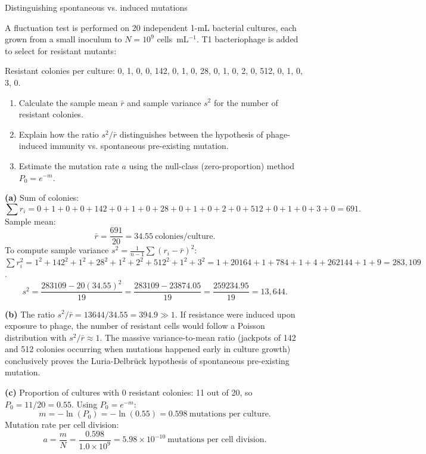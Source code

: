 \documentclass[12pt, a4paper, oneside]{report}
\begin{document}
\begin{problem}{\enspace{}\enspace
  Distinguishing spontaneous vs. induced mutations}

  A fluctuation test is performed on 20 independent 1-mL bacterial cultures, each grown from a small inoculum to $N = 10^9$ cells~mL$^{-1}$. T1 bacteriophage is added to select for resistant mutants:

  \begin{center}
  Resistant colonies per culture: 0, 1, 0, 0, 142, 0, 1, 0, 28, 0, 1, 0, 2, 0, 512, 0, 1, 0, 3, 0.
  \end{center}

  \begin{enumerate}
    \item Calculate the sample mean $\bar{r}$ and sample variance $s^2$ for the number of resistant colonies.
    \item Explain how the ratio $s^2 / \bar{r}$ distinguishes between the hypothesis of phage-induced immunity vs. spontaneous pre-existing mutation.
    \item Estimate the mutation rate $a$ using the null-class (zero-proportion) method $P_0 = e^{-m}$.
  \end{enumerate}
\end{problem}

\begin{solution}
  \textbf{(a)} Sum of colonies:
  \[
    \sum r_i = 0+1+0+0+142+0+1+0+28+0+1+0+2+0+512+0+1+0+3+0 = 691.
  \]
  Sample mean:
  \[
    \bar{r} = \frac{691}{20} = 34.55~\text{colonies/culture}.
  \]
  To compute sample variance $s^2 = \frac{1}{n-1} \sum (r_i - \bar{r})^2$:
  $\sum r_i^2 = 1^2 + 142^2 + 1^2 + 28^2 + 1^2 + 2^2 + 512^2 + 1^2 + 3^2 = 1 + 20164 + 1 + 784 + 1 + 4 + 262144 + 1 + 9 = 283{,}109$.
  \[
    s^2 = \frac{283109 - 20(34.55)^2}{19} = \frac{283109 - 23874.05}{19} = \frac{259234.95}{19} = 13{,}644.
  \]

  \textbf{(b)} The ratio $s^2 / \bar{r} = 13644 / 34.55 = 394.9 \gg 1$.
  If resistance were induced upon exposure to phage, the number of resistant cells would follow a Poisson distribution with $s^2 / \bar{r} \approx 1$. The massive variance-to-mean ratio (jackpots of 142 and 512 colonies occurring when mutations happened early in culture growth) conclusively proves the Luria-Delbrück hypothesis of spontaneous pre-existing mutation.

  \textbf{(c)} Proportion of cultures with 0 resistant colonies: 11 out of 20, so $P_0 = 11/20 = 0.55$.
  Using $P_0 = e^{-m}$:
  \[
    m = -\ln(P_0) = -\ln(0.55) = 0.598~\text{mutations per culture}.
  \]
  Mutation rate per cell division:
  \[
    a = \frac{m}{N} = \frac{0.598}{1.0 \times 10^9} = 5.98 \times 10^{-10}~\text{mutations per cell division}.
  \]
\end{solution}
\end{document}
